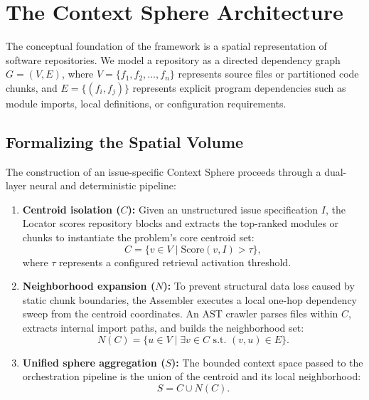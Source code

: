 \section{The Context Sphere Architecture}
\label{sec:approach}

The conceptual foundation of the framework is a spatial representation of software repositories. We model a repository as a directed dependency graph \(G=(V,E)\), where \(V=\{f_1,f_2,\dots,f_n\}\) represents source files or partitioned code chunks, and \(E=\{(f_i,f_j)\}\) represents explicit program dependencies such as module imports, local definitions, or configuration requirements.

\subsection{Formalizing the Spatial Volume}

The construction of an issue-specific Context Sphere proceeds through a dual-layer neural and deterministic pipeline:

\begin{enumerate}
    \item \textbf{Centroid isolation (\(C\)):} Given an unstructured issue specification \(I\), the Locator scores repository blocks and extracts the top-ranked modules or chunks to instantiate the problem's core centroid set:
    \begin{equation}
        C = \{v \in V \mid \text{Score}(v, I) > \tau\},
    \end{equation}
    where \(\tau\) represents a configured retrieval activation threshold.

    \item \textbf{Neighborhood expansion (\(N\)):} To prevent structural data loss caused by static chunk boundaries, the Assembler executes a local one-hop dependency sweep from the centroid coordinates. An AST crawler parses files within \(C\), extracts internal import paths, and builds the neighborhood set:
    \begin{equation}
        N(C) = \{u \in V \mid \exists v \in C \text{ s.t. } (v,u) \in E\}.
    \end{equation}

    \item \textbf{Unified sphere aggregation (\(S\)):} The bounded context space passed to the orchestration pipeline is the union of the centroid and its local neighborhood:
    \begin{equation}
        S = C \cup N(C).
    \end{equation}
\end{enumerate}

